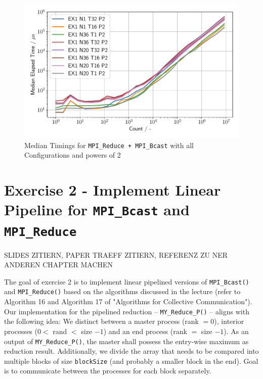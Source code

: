 \begin{figure}[h]
    \begin{center}
        \includegraphics[width=1\linewidth]{figures/Ex1_2.pdf}
        \caption{Median Timings for \texttt{MPI\_Reduce + MPI\_Bcast} with all Configurations and powers of 2}
        \label{Ex1_P2_median}
    \end{center}
\end{figure}

\pagebreak

\section{Exercise 2 - Implement Linear Pipeline for \texttt{MPI\_Bcast} and \texttt{MPI\_Reduce}}

SLIDES ZITIERN, PAPER TRAEFF ZITIERN, REFERENZ ZU NER ANDEREN CHAPTER MACHEN

The goal of exercise 2 is to implement linear pipelined versions of \texttt{MPI\_Bcast()} and \texttt{MPI\_Reduce()} 
based on the algorithms discussed in the lecture (refer to Algorithm 16 and Algorithm 17 of "Algorithms for Collective 
Communication"). \\

Our implementation for the pipelined reduction -- \texttt{MY\_Reduce\_P()} – aligns with the following idea: We 
distinct between a master process (rank $= 0$), interior processes ($0 <$ rand $<$ size $-1$) and an end process 
(rank $=$ size $-1$). As an output of \texttt{MY\_Reduce\_P()}, the master shall possess the entry-wise maximum as 
reduction result. Additionally, we divide the array that needs to be compared into multiple blocks of size 
\texttt{blockSize} (and probably a smaller block in the end). Goal is to communicate between the processes for each 
block separately. \\

